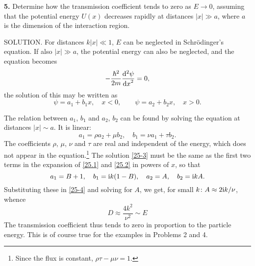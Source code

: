 {\textbf{5.} Determine how the transmission coefficient tends to zero as $ E \to0 $, assuming that the potential energy $ U (x) $ decreases rapidly at distances $ |x|\gg a $, where $ a $ is the dimension of the interaction region.





SOLUTION. For distances $ k |x| \ll1 $, $ E $ can be neglected in Schr\"odinger's equation. If also $ |x|\gg a $, the potential energy can also be neglected, and the equation becomes
\[ -\frac{\hbar^2}{2m}\frac{\mathrm{d}^2\psi}{{\mathrm{d} x}^2}=0, \]
the solution of this may be written as
\begin{equation}\label{25-3}
\psi=a_1+b_1x,\quad x<0,\qquad\psi=a_2+b_2x,\quad x>0.\tag{1}
\end{equation}

The relation between $ a_1 $, $ b_1 $ and $ a_2 $, $ b_2 $ can be found by solving the equation at distances $ |x|\sim a $. It is linear:
\begin{equation}\label{25-4}
a_1=\rho a_2+\mu b_2,\quad b_1=\nu a_1+\tau b_2.\tag{2}
\end{equation}
The coefficients $ \rho $, $ \mu $, $ \nu $ and $ \tau $ are real and independent of the energy, which does not appear in the equation.\footnote{Since the flux is constant, $ \rho\tau-\mu\nu= 1 $.
} The solution \eqref{25-3} must be the same as the first two terms in the expansion of \eqref{25.1} and \eqref{25.2} in powers of $ x $, so that
\[a_1=B+1,\quad b_1=\mathrm{i} k(1-B),\quad a_2=A,\quad b_2=\mathrm{i} kA. \]
Substituting these in \eqref{25-4} and solving for $ A $, we get, for small $ k\colon A \approx2\mathrm{i} k/\nu $, whence 
\[ D\approx\frac{4k^2}{\nu^2}\sim E \]
The transmission coefficient thus tends to zero in proportion to the particle energy. This is of course true for the examples in Problems 2 and 4. }